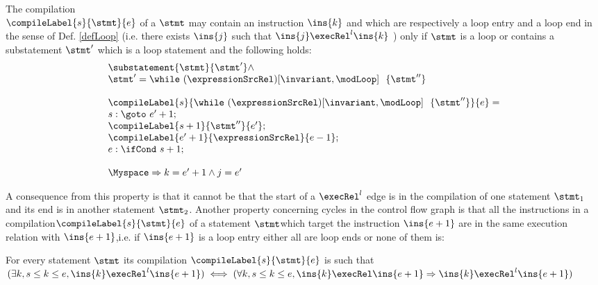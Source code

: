 \begin{compProp4}\label{compile:prop:compProp4}  %
The compilation \\ $\compileLabel{s}{\stmt}{e}$ of a $\stmt$ may contain an instruction $\ins{k}$ and   which are respectively 
a loop entry and a loop end  in the sense of Def.
\ref{defLoop} (i.e. there exists $\ins{j}$ such that $\ins{j} \execRel^{l} \ins{k}$ ) only if  $\stmt$ is a loop or contains 
 a substatement $\stmt'$ which is a loop statement and the following holds:
  $$\begin{array}{l}
                        \substatement{\stmt}{\stmt'} \wedge \\
			\stmt' = 
                       \while \ (\expressionSrcRel) \lbrack \invariant, \modLoop \rbrack \ \do \ \{ \stmt'' \} \\ \\ 

                        \compileLabel{s}{   \while \ (\expressionSrcRel) \lbrack \invariant, \modLoop \rbrack \ \do \ \{ \stmt'' \}   }{e} = \\
			s: \goto \ e' + 1; \\
	                \compileLabel{s +  1}{\stmt''}{e'}; \\
			 \compileLabel{e' +  1}{\expressionSrcRel}{e  -1 };\\
			 e: \ifCond \ s +  1; \\  \\
                        \Myspace \Rightarrow k = e' +1 \wedge j = e'  
                
	           \end{array} 
               $$ 
	   
              
             

\end{compProp4}
 
A consequence from this property is that it cannot be that the start of  a $\execRel^{l}$ edge is in the compilation of one statement $\stmt_1$
 and its end is in another statement $\stmt_2$.
Another property concerning cycles in the control flow graph is that all the instructions in a compilation$\compileLabel{s}{\stmt}{e}$   of a statement $\stmt 
$which target the instruction $\ins{e+1}$  are in the same execution relation with  $\ins{e+1}$,i.e. if  
$\ins{e+1}$ is a  loop entry either all are loop ends or none of them is:
\begin{compProp5}\label{compile:prop:compProp5} 
 For every statement $\stmt$ its compilation $\compileLabel{s}{\stmt}{e}$ is such that 
$(\exists k, s \le k \le e, \ins{k} \execRel^{l} \ins{e+1} ) \iff (\forall k, s \le k \le e, \ins{k} \execRel \ins{e+1}  \Rightarrow \ins{k} \execRel^{l} \ins{e+1} ) $
\end{compProp5}


